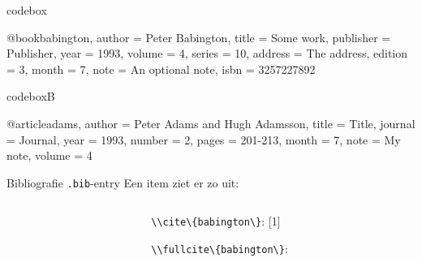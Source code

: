 

\begin{saveblock}{codebox}
	\begin{highlightblock}[linewidth=0.55\textwidth]
		@book{babington,
			author = {Peter Babington},
			title = {Some work},
			publisher = {Publisher},
			year = 1993,
			volume = 4,
			series = 10,
			address = {The address},
			edition = 3,
			month = 7,
			note = {An optional note},
			isbn = {3257227892}
		}
	\end{highlightblock}
\end{saveblock}

\begin{saveblock}{codeboxB}
	\begin{highlightblock}[linewidth=0.55\textwidth]
		@article{adams,
			author  = {Peter Adams
				and Hugh Adamsson},
			title   = {Title},
			journal = {Journal},
			year    = 1993,
			number  = 2,
			pages   = {201-213},
			month   = 7,
			note    = {My note}, 
			volume  = 4
		}
	\end{highlightblock}
\end{saveblock}

\begin{frame}{Bibliografie \texttt{.bib}-entry}
	Een item ziet er zo uit:
	
	\begin{columns}
		\begin{column}{0.55\textwidth}
		\end{column}
		\begin{column}{0.35\textwidth}%
			\lstinline|\\cite\{babington\}|: [1]
			
			\lstinline|\\fullcite\{babington\}|:\\
		\end{column}
	\end{columns}
\end{frame}
